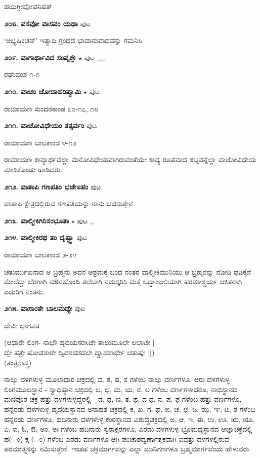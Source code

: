 {\hfill ಹಯಗ್ರೀವೋಪನಿಷತ್

\medskip
\noindent\textbf{೨೦೮. ವಸವೋ ವಾಸವಂ ಯಥಾ} \hfill ಪುಟ \pageref{250}

\hfill `ಅಭ್ಯಷಿಂಚನ್' ಇತ್ಯಾದಿ ಗ್ರಂಥದ ಭಾವಾನುವಾದವನ್ನು ಗಮನಿಸಿ.

\medskip
\noindent\textbf{೨೦೯. ವಾಗಾರ್ಥಾವಿದ ಸಂಪೃಕ್ತೌ} $\star$ \hfill ಪುಟ \pageref{21},\pageref{31},\pageref{223},\pageref{234},\pageref{238}

\hfill ರಘುವಂಶ ೧-೧

\medskip
\noindent\textbf{೨೧೦. ವಾಚಂ ಚೋದಾಹರಿಷ್ಯಾಮಿ} $\star$ \hfill ಪುಟ \pageref{232}

\hfill ರಾಮಾಯಣ ಸುಂದರಕಾಂಡ ೩೦-೧೭, ೧೮

\medskip
\noindent\textbf{೨೧೧. ವಾಚೋವಿಧೇಯಂ ತತ್ಸರ್ವಂ} \hfill ಪುಟ \pageref{189}

\hfill ರಾಮಾಯಣ ಬಾಲಕಾಂಡ ೪-೧೨

ರಾಮಾಯಣ ಕಾವ್ಯಾರ್ಥವೆಲ್ಲಾ ಮನೋವಿಧೇಯವಾಗಿರುವಂತೆಯೇ ಕಾವ್ಯ ರೂಪವಾದ ಶಬ್ದವನ್ನೆಲ್ಲಾ ವಾಚೋವಿಧೇಯ ಮಾಡಿಕೊಂಡು ಹಾಡಿದರು.

\medskip
\noindent\textbf{೨೧೨. ವಾತಾಪಿ ಗಣಪತಿಂ ಭಜೇಽಹಂ} \hfill ಪುಟ \pageref{45}

\hfill ವಾತಾಪಿ ಕ್ಷೇತ್ರದಲ್ಲಿರುವ ಗಣಪತಿಯನ್ನು ನಾನು ಭಜಿಸುತ್ತೇನೆ.

\medskip
\noindent\textbf{೨೧೩. ವಾಲ್ಮೀಕಿಗಿರಿಸಂಭೂತಾ} $\star$ \hfill ಪುಟ \pageref{151},\pageref{166},\pageref{174}

\medskip
\noindent\textbf{೨೧೪. ವಾಲ್ಮೀಕಿರಥ ತಂ ದೃಷ್ಟ್ವಾ} \hfill ಪುಟ \pageref{202}

\hfill ರಾಮಾಯಣ ಬಾಲಕಾಂಡ ೨-೨೪

ಚತುರ್ಮುಖನಾದ ಆ ಬ್ರಹ್ಮನು ಅವನ ಆಶ್ರಮಕ್ಕೆ ಬಂದ ನಂತರ ವಾಲ್ಮೀಕಿಮುನಿಯು ಆ ಬ್ರಹ್ಮನನ್ನು ನೋಡಿ ಥಟಕ್ಕನೆ ಮೇಲೆದ್ದು ಬೆರಗಾಗಿ ಮೌನಹೊಂದಿ  ತಲೆಬಾಗಿ ನಮಸ್ಕರಿಸಿ ಮತ್ತೆ ಬದ್ಧಾಂಜಲಿಯಾಗಿ ಪರಮಾಶ್ಚರ್ಯ ಚಕಿತನಾಗಿ ಎದುರಿಗೆ ನಿಂತನು.

\medskip
\noindent\textbf{೨೧೫. ವಾಸಾಂತೇ ಬಾಲಮಧ್ಯೇ} \hfill ಪುಟ \pageref{29}

\hfill ದೇವೀ ಭಾಗವತ

\begin{shloka}
(ಆಧಾರೇ ಲಿಂಗ- ನಾಭೌ ಹೃದಯಸರಸಿಜೇ ತಾಲುಮೂಲೇ ಲಲಾಟೇ |\\
ದ್ವೇ ಪತ್ರೇ ಷೋಡಶಾರೇ ದ್ವಿದಶದಶದಲೇ ದ್ವಾದಶಾರ್ಧೇ ಚತುಷ್ಕೇ ||)\\
\hfill (ತಂತ್ರಶಾಸ್ತ್ರ)
\end{shloka}

ನಾಲ್ಕು ದಳಗಳುಳ್ಳ ಮೂಲಾಧಾರ ಚಕ್ರದಲ್ಲಿ ವ, ಶ, ಷ, ಸ ಗಳೆಂಬ ನಾಲ್ಕು ವರ್ಣಗಳೂ,  ಆರು ದಳಗಳುಳ್ಳ ಲಿಂಗಮೂಲಸ್ಥಾನ - ಸ್ವಾಧಿಷ್ಠಾನ ಚಕ್ರದಲ್ಲಿ ಬ, ಭ, ಮ, ಯ, ರ, ಲ ಗಳೆಂಬ ವರ್ಣಗಳಾದರೂ, ನಾಭಿಸ್ಥಾನದ ಮಣಿಪೂರ ಚಕ್ರ ಹತ್ತು ದಳಗಳುಳ್ಳದ್ದರಲ್ಲಿ - ಡ, ಢ, ಣ, ತ, ಥ, ದ ಧ, ನ, ಪ, ಫ ಗಳೆಂಬ ಹತ್ತು ವರ್ಣಗಳೂ, ಹನ್ನೆರಡು ದಳಗಳುಳ್ಳ ಹೃದಯಸ್ಥಾನದ ಅನಾಹತ ಚಕ್ರದಲ್ಲಿ ಕ, ಖ, ಗ, ಘ, ಙ, ಚ, ಛ, ಜ, ಝ, ಞ, ಟ, ಠ ಗಳೆಂಬ ಹನ್ನೆರಡು ವರ್ಣಗಳೂ, ಹದಿನಾರು ದಳಗಳುಳ್ಳ ಕಂಠಸ್ಥಾನದ ವಿಶುದ್ಧಚಕ್ರದಲ್ಲಿ ಅ, ಆ, ಇ, ಈ, ಉ, ಊ, ಋ, ೠ, ಏ, ಐ, ಓ, ಔ, ಅಂ, ಅಃ ಗಳೆಂಬ ಹದಿನಾರು ಸ್ವರಾಕ್ಷರಗಳೂ, ಎರಡು ದಳಗಳುಳ್ಳ ಭ್ರೂಮಧ್ಯಸ್ಥಾನದ ಆಜ್ಞಾಚಕ್ರದಲ್ಲಿ ಹ(ಂ) ಕ್ಷ (ಂ) ಗಳೆಂಬ ಎರಡು ವರ್ಣಗಳೂ ಆಗಿ ಪಂಚಾಶದ್ವರ್ಣಾತ್ಮಕವಾಗಿ ಐವತ್ತು ದಳಗಳಲ್ಲಿರುವ ಪರಮಾತ್ಮನನ್ನು ನಮಿಸುತ್ತೇನೆ. ಇಂತಹ ಚಕ್ರಮಾರ್ಗವನ್ನು ಎಲ್ಲಾ ಮುನಿಗಣಗಳೂ ಬ್ರಹ್ಮಮಾರ್ಗವೆಂದು ಹೇಳುವರು.

}
